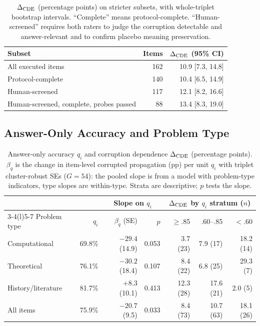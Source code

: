 \begin{table}[!htb]\centering\small\setlength{\tabcolsep}{3pt}
\caption{$\Delta_{\mathrm{CDE}}$ (percentage points) on stricter subsets, with whole-triplet bootstrap intervals. ``Complete'' means protocol-complete. ``Human-screened'' requires both raters to judge the corruption detectable and answer-relevant and to confirm placebo meaning preservation.}
\label{tab:subsets}
\begin{tabular}{@{}lrr@{}}
\toprule Subset & Items & $\Delta_{\mathrm{CDE}}$ (95\% CI) \\
\midrule
All executed items & 162 & 10.9 [7.3, 14.8] \\
Protocol-complete & 140 & 10.4 [6.5, 14.9] \\
Human-screened & 117 & 12.1 [8.2, 16.6] \\
Human-screened, complete, probes passed & 88 & 13.4 [8.3, 19.0] \\
\bottomrule\end{tabular}
\end{table}

\subsection{Answer-Only Accuracy and Problem Type}
\label{sec:answeronlyresults}

\begin{table}[!htb]\centering\small\setlength{\tabcolsep}{1.8pt}
\caption{Answer-only accuracy $q_i$ and corruption dependence $\Delta_{\mathrm{CDE}}$ (percentage points). $\beta_q$ is the change in item-level corrupted propagation (pp) per unit $q_i$ with triplet cluster-robust SEs ($G=54$): the pooled slope is from a model with problem-type indicators, type slopes are within-type. Strata are descriptive; $p$ tests the slope.}
\label{tab:difficulty}
\begin{tabular}{@{}lrrrrrr@{}}
\toprule & & \multicolumn{2}{c}{Slope on $q_i$} & \multicolumn{3}{c}{$\Delta_{\mathrm{CDE}}$ by $q_i$ stratum ($n$)} \\
\cmidrule(lr){3-4}\cmidrule(l){5-7}
Problem type & $q_i$ & $\beta_q$ (SE) & $p$ & $\ge$.85 & .60--.85 & $<$.60 \\
\midrule
Computational & 69.8\% & $-29.4$ (14.9) & 0.053 & 3.7 (23) & 7.9 (17) & 18.2 (14) \\
Theoretical & 76.1\% & $-30.2$ (18.4) & 0.107 & 8.4 (22) & 6.8 (25) & 29.3 (7) \\
History/literature & 81.7\% & $+8.3$ (10.1) & 0.413 & 12.3 (28) & 17.6 (21) & 2.0 (5) \\
\midrule
All items & 75.9\% & $-20.7$ (9.5) & 0.033 & 8.4 (73) & 10.7 (63) & 18.1 (26) \\
\bottomrule\end{tabular}
\end{table}

